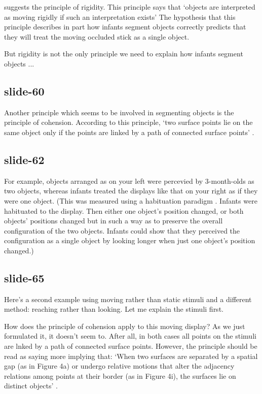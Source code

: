 \documentclass[12pt,\papersize]{extarticle}
\begin{document}
\citet{Spelke:1990jn} suggests the principle of rigidity.
This principle says that ‘objects are interpreted as moving rigidly if such an interpretation 
exists’
The hypothesis that this principle describes in part how infants segment objects correctly
predicts that they will treat the moving occluded stick as a single object.
 
But rigidity is not the only principle we need to explain how infants segment objects ...
 
\subsection{slide-60}
Another principle which seems to be involved in segmenting objects is the principle of 
cohension.
According to this principle, ‘two surface points lie on the same object only if the points are 
linked by a path of connected surface points’ \citep{Spelke:1990jn}.
 
\subsection{slide-62}
For example, objects arranged as on your left were percevied by 3-month-olds as two objects, 
whereas infants treated the displays like that on your right as if they were one object.
(This was measured using a habituation paradigm \citep{kestenbaum:1987_perception}.  Infants 
were habituated to the display.  Then either one object's position changed, or both objects' 
positions changed but in such a way as to preserve the overall configuration of the two 
objects.  Infants could show that they perceived the configuration as a single object by 
looking longer when just one object's position changed.)
 
\subsection{slide-65}
Here's a second example using moving rather than static stimuli and a different method: 
reaching rather than looking.
Let me explain the stimuli first.
 
How does the principle of cohension apply to this moving display? 
As we just formulated it, it doesn't seem to.  After all, in both cases all points on the 
stimuli are lnked by a path of connected surface points.
However, the principle should be read as saying more implying that:
‘When two surfaces are separated by a spatial gap (as in Figure 4a) or undergo relative motions 
that alter the adjacency relations among points at their border (as in Figure 4i), the 
surfaces lie on distinct objects’ \citep[p.\ 49]{Spelke:1990jn}.
 
\end{document}
